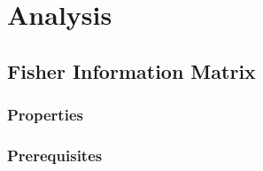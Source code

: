 \chapter{Analysis}
\label{sec:ana}


\section{Fisher Information Matrix}
\label{sec:fisher}

\subsection{Properties}


\subsection{Prerequisites}